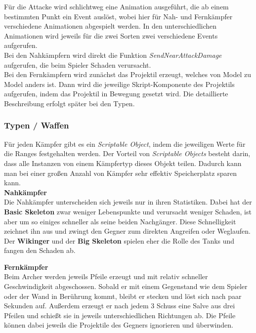 
Für die Attacke wird schlichtweg eine Animation ausgeführt, die ab einem bestimmten Punkt ein Event auslöst, wobei hier für Nah- und Fernkämpfer verschiedene Animationen abgespielt werden. In den unterschiedlichen Animationen wird jeweils für die zwei Sorten zwei verschiedene Events aufgerufen. \\

Bei den Nahkämpfern wird direkt die Funktion \textit{SendNearAttackDamage} aufgerufen, die beim Spieler Schaden verursacht. \\
Bei den Fernkämpfern wird zunächst das Projektil erzeugt, welches von Model zu Model anders ist. Dann wird die jeweilige Skript-Komponente des Projektils aufgerufen, indem das Projektil in Bewegung gesetzt wird. Die detaillierte Beschreibung erfolgt später bei den Typen.

\subsubsection{Typen / Waffen}

Für jeden Kämpfer gibt es ein \textit{Scriptable Object}, indem die jeweiligen Werte für die Ranges festgehalten werden. Der Vorteil von \textit{Scriptable Objects} besteht darin, dass alle Instanzen von einem Kämpfertyp dieses Objekt teilen. Dadurch kann man bei einer großen Anzahl von Kämpfer sehr effektiv Speicherplatz sparen kann. \\

\textbf{Nahkämpfer} \\

Die Nahkämpfer unterscheiden sich jeweils nur in ihren Statistiken. Dabei hat der \textbf{Basic Skeleton} zwar weniger Lebenspunkte und verursacht weniger Schaden, ist aber um so einiges schneller als seine beiden Nachgänger. Diese Schnelligkeit zeichnet ihn aus und zwingt den Gegner zum direkten Angreifen oder Weglaufen. Der \textbf{Wikinger} und der \textbf{Big Skeleton} spielen eher die Rolle des Tanks und fangen den Schaden ab. \\


\textbf{Fernkämpfer} \\

Beim Archer werden jeweils Pfeile erzeugt und mit relativ schneller Geschwindigkeit abgeschossen. Sobald er mit einem Gegenstand wie dem Spieler oder der Wand in Berührung kommt, bleibt er stecken und löst sich nach paar Sekunden auf. Außerdem erzeugt er nach jedem 3 Schuss eine Salve aus drei Pfeilen und schießt sie in jeweils unterschiedlichen Richtungen ab. Die Pfeile können dabei jeweils die Projektile des Gegners ignorieren und überwinden.\\


